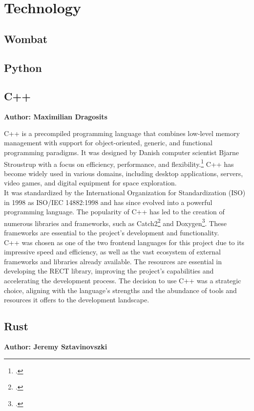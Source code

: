\chapter{Technology}


\section{Wombat}

\section{Python}

\section{C++}
\textbf{Author: Maximilian Dragosits}

C++ is a precompiled programming language that combines low-level memory management with support for object-oriented, generic, and functional programming paradigms. 
It was designed by Danish computer scientist Bjarne Stroustrup with a focus on efficiency, performance, and flexibility.\footcite{lecture_essence_cpp} C++ has 
become widely used in various domains, including desktop applications, servers, video games, and digital equipment for space exploration.\\

It was standardized by the International Organization for Standardization (ISO) in 1998 as ISO/IEC 14882:1998 and has since evolved into a powerful programming 
language. The popularity of C++ has led to the creation of numerous libraries and frameworks, such as Catch2\footcite{catch2_git} and Doxygen\footcite{doxygen_main_site}. 
These frameworks are essential to the project's development and functionality.\\

C++ was chosen as one of the two frontend languages for this project due to its impressive speed and efficiency, as well as the vast ecosystem of external 
frameworks and libraries already available. The resources are essential in developing the RECT library, improving the project's capabilities and accelerating 
the development process. The decision to use C++ was a strategic choice, aligning with the language's strengths and the abundance of tools and resources it 
offers to the development landscape.

\section{Rust}
\textbf{Author: Jeremy Sztavinovszki}

